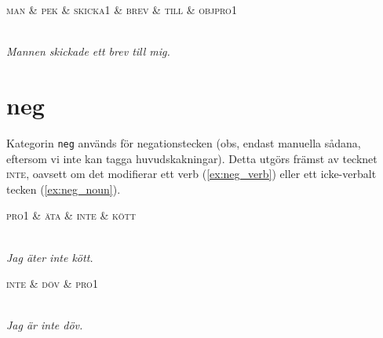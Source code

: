 \documentclass[11pt,a4paper]{article}
\begin{document}
\begin{example}
\label{ex:det_pek}
\begin{dependency}[theme = simple]
   \begin{deptext}[column sep=1em]
      \textsc{man} \& \textsc{pek} \& \textsc{skicka1} \& \textsc{brev} \& \textsc{till} \& \textsc{objpro1} \\
   \end{deptext}
\end{dependency}
\\
\textit{Mannen skickade ett brev till mig.}
\end{example}


\section{neg}
\label{sec:neg}
Kategorin \texttt{neg} används för negationstecken (obs, endast manuella sådana, eftersom vi inte kan tagga huvudskakningar). Detta utgörs främst av tecknet \textsc{inte}, oavsett om det modifierar ett verb (\ref{ex:neg_verb}) eller ett icke-verbalt tecken (\ref{ex:neg_noun}). 

\begin{example}
\label{ex:neg_verb}
\begin{dependency}[theme = simple]
   \begin{deptext}[column sep=1em]
      \textsc{pro1}  \& \textsc{äta} \& \textsc{inte} \& \textsc{kött} \\
   \end{deptext}
\end{dependency}
\\
\textit{Jag äter inte kött.}
\end{example}

\begin{example}
\label{ex:neg_noun}
\begin{dependency}[theme = simple]
   \begin{deptext}[column sep=1em]
      \textsc{inte} \& \textsc{döv} \& \textsc{pro1} \\
   \end{deptext}
\end{dependency}
\\
\textit{Jag är inte döv.}
\end{example}
\end{document}
